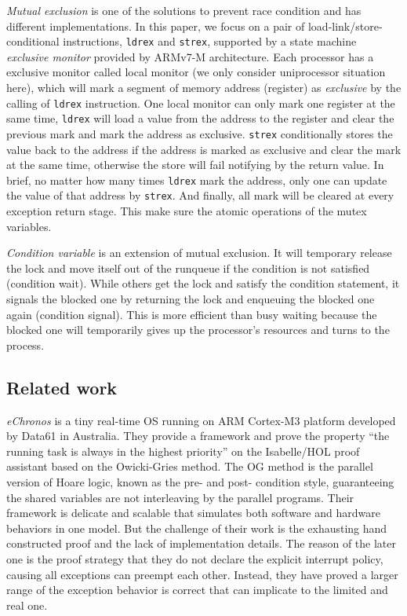 \textit{Mutual exclusion} is one of the solutions to prevent race condition and has different implementations. In this paper, we focus on a pair of load-link/store-conditional instructions, \texttt{ldrex} and \texttt{strex}, supported by a state machine \textit{exclusive monitor} provided by ARMv7-M architecture. Each processor has a exclusive monitor called local monitor (we only consider uniprocessor situation here), which will mark a segment of memory address (register) as \textit{exclusive} by the calling of \texttt{ldrex} instruction. One local monitor can only mark one register at the same time, \texttt{ldrex} will load a value from the address to the register and clear the previous mark and mark the address as exclusive. \texttt{strex} conditionally stores the value back to the address if the address is marked as exclusive and clear the mark at the same time, otherwise the store will fail notifying by the return value. In brief, no matter how many times \texttt{ldrex} mark the address, only one can update the value of that address by \texttt{strex}. And finally, all mark will be cleared at every exception return stage. This make sure the atomic operations of the mutex variables.

\textit{Condition variable} is an extension of mutual exclusion. It will temporary release the lock and move itself out of the runqueue if the condition is not satisfied (condition wait). While others get the lock and satisfy the condition statement, it signals the blocked one by returning the lock and enqueuing the blocked one again (condition signal). This is more efficient than busy waiting because the blocked one will temporarily gives up the processor's resources and turns to the process.

\subsection{Related work}
\textit{eChronos} \cite{DBLP:conf/itp/AndronickLMMR16} is a tiny real-time OS running on ARM Cortex-M3 platform developed by Data61 in Australia. They provide a framework and prove the property ``the running task is always in the highest priority'' on the Isabelle/HOL proof assistant based on the Owicki-Gries \cite{Owicki:1976:APT:2696887.2697004} method. The OG method is the parallel version of Hoare logic, known as the pre- and post- condition style, guaranteeing the shared variables are not interleaving by the parallel programs. Their framework is delicate and scalable that simulates both software and hardware behaviors in one model. But the challenge of their work is the exhausting hand constructed proof and the lack of implementation details. The reason of the later one is the proof strategy that they do not declare the explicit interrupt policy, causing all exceptions can preempt each other. Instead, they have proved a larger range of the exception behavior is correct that can implicate to the limited and real one.

